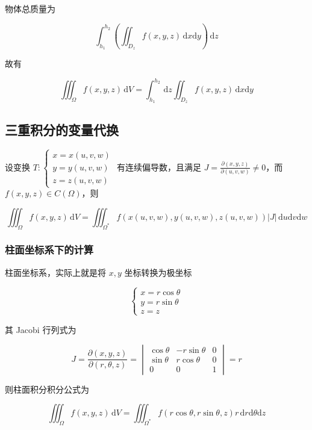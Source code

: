 \documentclass[lang = zh , final , oneside , openany , titlepage , zihao = -4 , linespread = 1.3 , baselineskip = false , cjk-font = windows , text-font = newtx , math-font = newtx , math-style = ISO , uppercase-greek = upright , integral-limits = false]{sjtureport}
\begin{document}
物体总质量为

\[\int_{h_1}^{h_2}\left(\iint_{D_z} f(x,y,z)\,\mathrm{d}x\mathrm{d}y\right) \,\mathrm{d}z\]

故有

\[\iiint_\Omega f(x,y,z)\,\mathrm{d}V = \int_{h_1}^{h_2}\,\mathrm{d}z\iint_{D_z} f(x,y,z)\,\mathrm{d}x\mathrm{d}y\]

\subsection{三重积分的变量代换}

\begin{theorem}
    设变换 \(T:\left\{\begin{aligned}x=x(u,v,w)\\y=y(u,v,w)\\z=z(u,v,w)\end{aligned}\right.\)
有连续偏导数，且满足
\(J=\frac{\partial (x,y,z)}{\partial (u,v,w)}\neq 0\)，而
\(f(x,y,z)\in C(\Omega)\)，则

\[\iiint_\Omega f(x,y,z)\,\mathrm{d}V = \iiint_{\Omega^*} f(x(u,v,w),y(u,v,w),z(u,v,w))\left\vert J \right\vert \,\mathrm{d}u\mathrm{d}v\mathrm{d}w\]
\end{theorem}

\subsubsection{柱面坐标系下的计算}

柱面坐标系，实际上就是将 \(x,y\) 坐标转换为极坐标

\[\left\{
\begin{aligned}
x = r\cos\theta\\
y = r\sin\theta\\
z = z
\end{aligned}\right.
\]

其 Jacobi 行列式为

\[J = \frac{\partial (x,y,z)}{\partial (r,\theta,z)} = \begin{vmatrix}
\cos\theta & -r\sin\theta & 0\\
\sin\theta & r\cos\theta & 0\\
0 & 0 & 1 
\end{vmatrix} = r\]

则柱面积分积分公式为

\[\iiint_\Omega f(x,y,z)\,\mathrm{d}V = \iiint_{\Omega^*} f(r\cos\theta,r\sin\theta,z)r\,\mathrm{d}r\mathrm{d}\theta\mathrm{d}z\]
\end{document}
